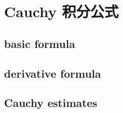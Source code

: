 \section{Cauchy 积分公式}
\label{b3:sec:0203}


\subsection{basic formula}
\label{b3:subsec:020301}

\subsection{derivative formula}
\label{b3:subsec:020302}

\subsection{Cauchy estimates}
\label{b3:subsec:020303}


